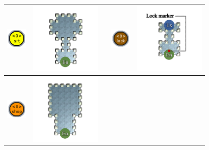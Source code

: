 \begin{longtable}{
    | >{\centering\arraybackslash} m{1.0cm}
    | >{\centering\arraybackslash} m{3.5cm}
    | >{} m{1.0cm}
    | >{\centering\arraybackslash} m{1.0cm}
    | >{\centering\arraybackslash} m{3.5cm} | }
    \\\cline{1-2}\cline{4-5}
  \begin{minipage}{.3\textwidth}\includegraphics[width=10mm]{figures/mission-grammars-alphabet/t-secret.png}\end{minipage}
    & \begin{minipage}{.3\textwidth}\includegraphics[width=35mm]{figures/mission-grammars-ins-rep/instruction-09.png}\end{minipage}
    &
    & \begin{minipage}{.3\textwidth}\includegraphics[width=10mm]{figures/mission-grammars-alphabet/t-lock.png}\end{minipage}
    & \begin{minipage}{.3\textwidth}\includegraphics[width=35mm]{figures/mission-grammars-ins-rep/instruction-10.png}\end{minipage}
    \\\cline{1-2}\cline{4-5}
  \begin{minipage}{.3\textwidth}\includegraphics[width=10mm]{figures/mission-grammars-alphabet/t-shop.png}\end{minipage}
    & \begin{minipage}{.3\textwidth}\includegraphics[width=35mm]{figures/mission-grammars-ins-rep/instruction-11.png}\end{minipage}

\end{longtable}
